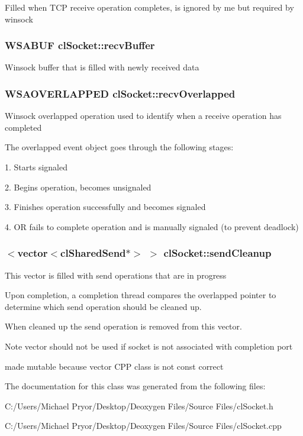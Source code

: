 \label{classcl_socket_a3d6b17db1b4743a14efcf02205113ae8}
Filled when TCP receive operation completes, is ignored by me but required by winsock \hypertarget{classcl_socket_aa33f69522e06a1ddaaf589cb21f0f60d}{
\subsubsection[{recvBuffer}]{\setlength{\rightskip}{0pt plus 5cm}WSABUF {\bf clSocket::recvBuffer}}}
\label{classcl_socket_aa33f69522e06a1ddaaf589cb21f0f60d}
Winsock buffer that is filled with newly received data \hypertarget{classcl_socket_aec458d824ec2454b0db2869fc8f87623}{
\subsubsection[{recvOverlapped}]{\setlength{\rightskip}{0pt plus 5cm}WSAOVERLAPPED {\bf clSocket::recvOverlapped}}}
\label{classcl_socket_aec458d824ec2454b0db2869fc8f87623}
Winsock overlapped operation used to identify when a receive operation has completed \par
 The overlapped event object goes through the following stages: \par
 1. Starts signaled \par
 2. Begins operation, becomes unsignaled \par
 3. Finishes operation successfully and becomes signaled \par
 4. OR fails to complete operation and is manually signaled (to prevent deadlock) \hypertarget{classcl_socket_a9e241858d57abe94c6e600040882091e}{
\subsubsection[{sendCleanup}]{$<$vector$<${\bf clSharedSend}$\ast$$>$ $>$ {\bf clSocket::sendCleanup}}}
\label{classcl_socket_a9e241858d57abe94c6e600040882091e}
This vector is filled with send operations that are in progress \par
 Upon completion, a completion thread compares the overlapped pointer to determine which send operation should be cleaned up. \par
 When cleaned up the send operation is removed from this vector. \begin{DoxyNote}{Note}
vector should not be used if socket is not associated with completion port 

made mutable because vector CPP class is not const correct 
\end{DoxyNote}


The documentation for this class was generated from the following files:\begin{DoxyCompactItemize}
\item 
C:/Users/Michael Pryor/Desktop/Deoxygen Files/Source Files/clSocket.h\item 
C:/Users/Michael Pryor/Desktop/Deoxygen Files/Source Files/clSocket.cpp\end{DoxyCompactItemize}
